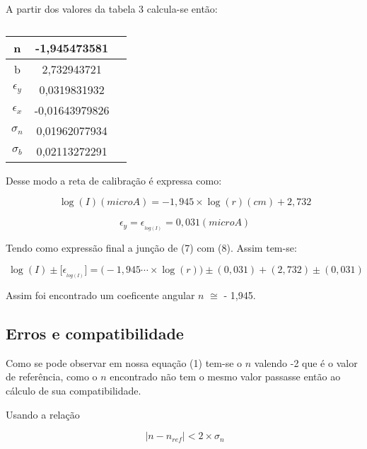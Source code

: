 \documentclass [a4paper, 12pt]{article}
\begin{document}
A partir dos valores da tabela 3 calcula-se então:


\begin{table}[h!]
\centering
\caption{\empty}
\vspace{0.1 cm}
\begin{tabular}{|c|c|c|} \hline

n               &    -1,945473581    \\ \hline
b               &     2,732943721    \\ \hline
$\epsilon_y$    &     0,0319831932   \\ \hline
$\epsilon_x$    &    -0,01643979826  \\ \hline
$\sigma_n$      &    0,01962077934   \\ \hline
$\sigma_b$      &    0,02113272291   \\ \hline

\end{tabular}
\end{table}
\newpage
Desse modo a reta de calibração é expressa como:

\begin{equation}
  \ \log (I) (microA) = -1,945\times\log (r) (cm) + 2,732
\end{equation}

\begin{equation}
  \ \epsilon_y = \epsilon_{_{log(I)}} = 0,031 (microA)
\end{equation}

Tendo como expressão final a junção de (7) com (8). Assim tem-se:

\begin{equation}
  \ \log (I) \pm \big[ \epsilon_{_{log(I)}} \big] = \Big(-1,945\cdots\times\log (r)\Big) \pm (0,031) + (2,732) \pm (0,031)
\end{equation}

Assim foi encontrado um coeficente angular $n$ $\cong$ - 1,945.


\subsection{Erros e compatibilidade}

Como se pode observar em nossa equação (1) tem-se o $n$ valendo -2 que é o valor de referência, como o $n$ encontrado não tem o mesmo valor passasse então ao cálculo de sua compatibilidade.

Usando a relação

\begin{equation}
  \ \Big|n - n_{ref}\Big| < 2\times\sigma_n
\end{equation}
\end{document}
